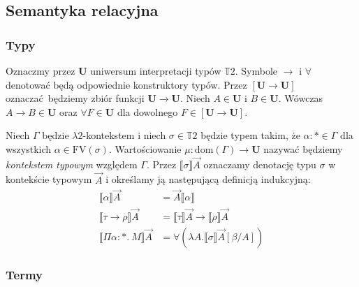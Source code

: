 \subsection{Semantyka relacyjna}
\subsubsection{Typy}
Oznaczmy przez \(\mathbf{U}\) uniwersum interpretacji typów \(\mathbb{T}2\). Symbole \(\to\) i \(\forall\) denotować będą odpowiednie konstruktory typów. Przez \([\mathbf{U}\to \mathbf{U}]\) oznaczać będziemy zbiór funkcji \(\mathbf{U}\to \mathbf{U}\). Niech \(A\in \mathbf{U}\) i \(B\in \mathbf{U}\). Wówczas \(A\to B\in \mathbf{U}\) oraz \(\forall F\in \mathbf{U}\) dla dowolnego \(F\in[\mathbf{U}\to \mathbf{U}]\).

Niech \(\Gamma\) będzie \(\lambda 2\)-kontekstem i niech \(\sigma\in\mathbb{T}2\) będzie typem takim, że  \(\alpha : * \in \Gamma \) dla wszystkich \(\alpha\in \mathrm{FV}(\sigma)\). Wartościowanie \(\mu:\mathrm{dom}(\Gamma)\to\mathbf{U}\) nazywać będziemy \emph{kontekstem typowym} względem \(\Gamma\).  Przez \(\llbracket \sigma \rrbracket \vec{A}\) oznaczamy denotację typu \(\sigma\) w kontekście typowym \(\vec{A}\)  i określamy ją następującą definicją indukcyjną:
\begin{align*}
  \llbracket \alpha \rrbracket\vec{A} &= \vec{A}\llbracket{\alpha}\rrbracket \\
  \llbracket \tau\to \rho\rrbracket \vec{A} &= \llbracket \tau\rrbracket \vec{A}\to\llbracket \rho \rrbracket \vec{A} \\
  \llbracket \Pi \alpha : *.\ M \rrbracket \vec{A} &= \forall (\lambda A. \llbracket \sigma\rrbracket \vec{A} [\beta/A])
\end{align*}
\subsubsection{Termy}
